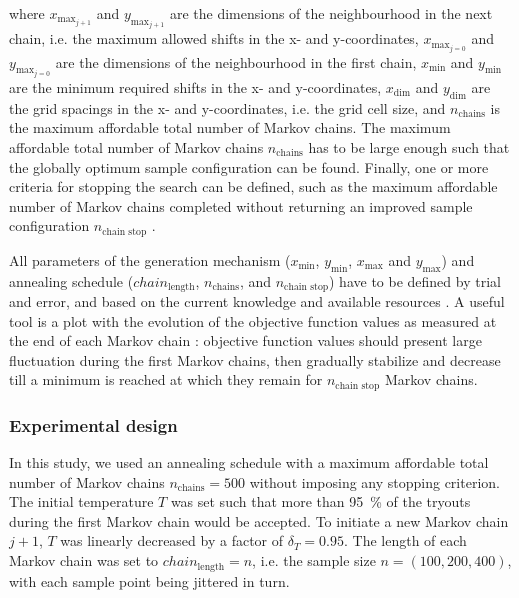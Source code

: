 \noindent where $x_{\text{max}_{j + 1}}$ and $y_{\text{max}_{j + 1}}$ are the dimensions of the neighbourhood 
in the next chain, i.e. the maximum allowed shifts in the x- and y-coordinates, $x_{\text{max}_{j = 0}}$ and 
$y_{\text{max}_{j = 0}}$ are the dimensions of the neighbourhood in the first chain, $x_\text{min}$ and 
$y_\text{min}$ are the minimum required shifts in the x- and y-coordinates, $x_\text{dim}$ and $y_\text{dim}$ 
are the grid spacings in the x- and y-coordinates, i.e. the grid cell size, and $n_\text{chains}$ is the 
maximum affordable total number of Markov chains. The maximum affordable total number of Markov chains 
$n_\text{chains}$ has to be large enough such that the globally optimum sample configuration can be found. 
Finally, one or more criteria for stopping the search can be defined, such as the maximum affordable number of 
Markov chains completed without returning an improved sample configuration $n_\text{chain stop}$ 
\cite{Groenigen1999a}.

All parameters of the generation mechanism ($x_\text{min}$, $y_\text{min}$, $x_\text{max}$ and $y_\text{max}$) 
and annealing schedule ($chain_\text{length}$, $n_\text{chains}$, and $n_\text{chain stop}$) have to be defined 
by trial and error, and based on the current knowledge and available resources \cite{WebsterEtAl2013}. A useful 
tool is a plot with the evolution of the objective function values as measured at the end of each Markov chain 
\cite{LarkEtAl2003}: objective function values should present large fluctuation during the first Markov chains, 
then gradually stabilize and decrease till a minimum is reached at which they remain for $n_\text{chain stop}$ 
Markov chains.

\subsubsection{Experimental design}

In this study, we used an annealing schedule with a maximum affordable total number of Markov chains 
$n_\text{chains} = 500$ without imposing any stopping criterion. The initial temperature $T$ was set such that 
more than \SI{95}{\percent} of the tryouts during the first Markov chain would be accepted. To initiate a new 
Markov chain $j + 1$, $T$ was linearly decreased by a factor of $\delta_{T} = 0.95$. The length of each Markov 
chain was set to $chain_\text{length} = n$, i.e. the sample size $n = (100, 200, 400)$, with each sample point 
being jittered in turn.

